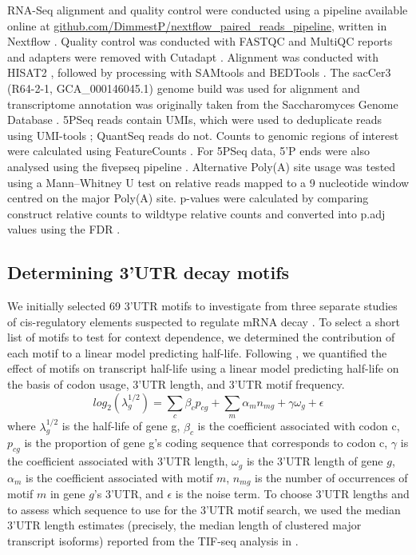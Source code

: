 \documentclass[../main.tex]{subfiles}
\begin{document}
RNA-Seq alignment and quality control were conducted using a pipeline available online at  \href{https://github.com/DimmestP/nextflow_paired_reads_pipeline}{github.com/DimmestP/nextflow\_paired\_reads\_pipeline}, written in Nextflow \parencite{DiTommaso2017}.
Quality control was conducted with FASTQC and MultiQC reports \parencite{Ewels2016} and adapters were removed with Cutadapt \parencite{Martin2011}.
Alignment was conducted with HISAT2 \parencite{Kim2019}, followed by processing with SAMtools \parencite{Li2009} and BEDTools \parencite{Quinlan2010}.
The sacCer3 (R64-2-1, GCA\_000146045.1) genome build was used for alignment and transcriptome annotation was originally taken from the Saccharomyces Genome Database \parencite{Ng2020}.
5PSeq reads contain UMIs, which were used to deduplicate reads using UMI-tools \parencite{Smith2017}; QuantSeq reads do not.
Counts to genomic regions of interest were calculated using FeatureCounts \parencite{Liao2014}.
For 5PSeq data, 5'P ends were also analysed using the fivepseq pipeline \cite{Nersisyan2020}.
Alternative Poly(A) site usage was tested using a Mann–Whitney U test \parencite{Mann1947} on relative reads mapped to a 9 nucleotide window centred on the major Poly(A) site.
p-values were calculated by comparing construct relative counts to wildtype relative counts and converted into p.adj values using the FDR \parencite{Benjamini1995}.


\subsection{Determining 3'UTR decay motifs}

We initially selected 69 3'UTR motifs to investigate from three separate studies of cis-regulatory elements suspected to regulate mRNA decay \parencite{Hogan2008, Shalgi2005, Cheng2017}.
To select a short list of motifs to test for context dependence, we determined the contribution of each motif to a linear model predicting half-life.
Following \parencite{Cheng2017}, we quantified the effect of motifs on transcript half-life using a linear model predicting half-life on the basis of codon usage, 3'UTR length, and 3'UTR motif frequency.
\[log_2(\lambda_g^{1/2}) = \sum_c\beta_cp_{cg} + \sum_m\alpha_mn_{mg} + \gamma \omega_g + \epsilon\]
where \(\lambda_g^{1/2}\) is the half-life of gene g, \(\beta_c\) is the coefficient associated with codon c, \(p_{cg}\) is the proportion of gene g's coding sequence that corresponds to codon c, \(\gamma\) is the coefficient associated with 3'UTR length, \(\omega_g\) is the 3'UTR length of gene \(g\), \(\alpha_m\) is the coefficient associated with motif \(m\), \(n_{mg}\) is the number of occurrences of motif \(m\) in gene \(g\)'s 3'UTR, and \(\epsilon\) is the noise term.
To choose 3'UTR lengths and to assess which sequence to use for the 3'UTR motif search, we used the median 3'UTR length estimates (precisely, the median length of clustered major transcript isoforms) reported from the TIF-seq analysis in \parencite{Pelechano2013}.
\end{document}
